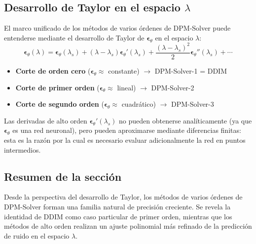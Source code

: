 \subsection{Desarrollo de Taylor en el espacio $\lambda$}

El marco unificado de los métodos de varios órdenes de DPM-Solver puede entenderse mediante el desarrollo de Taylor de $\boldsymbol{\epsilon}_\theta$ en el espacio $\lambda$:
$$\boldsymbol{\epsilon}_\theta(\lambda) = \boldsymbol{\epsilon}_\theta(\lambda_s) + (\lambda - \lambda_s) \boldsymbol{\epsilon}_\theta'(\lambda_s) + \frac{(\lambda - \lambda_s)^2}{2} \boldsymbol{\epsilon}_\theta''(\lambda_s) + \cdots$$

\begin{itemize}
    \item \textbf{Corte de orden cero} ($\boldsymbol{\epsilon}_\theta \approx$ constante) $\to$ DPM-Solver-1 = DDIM
    \item \textbf{Corte de primer orden} ($\boldsymbol{\epsilon}_\theta \approx$ lineal) $\to$ DPM-Solver-2
    \item \textbf{Corte de segundo orden} ($\boldsymbol{\epsilon}_\theta \approx$ cuadrático) $\to$ DPM-Solver-3
\end{itemize}

Las derivadas de alto orden $\boldsymbol{\epsilon}_\theta'(\lambda_s)$ no pueden obtenerse analíticamente (ya que $\boldsymbol{\epsilon}_\theta$ es una red neuronal), pero pueden aproximarse mediante diferencias finitas: esta es la razón por la cual es necesario evaluar adicionalmente la red en puntos intermedios.

\subsection{Resumen de la sección}

Desde la perspectiva del desarrollo de Taylor, los métodos de varios órdenes de DPM-Solver forman una familia natural de precisión creciente. Se revela la identidad de DDIM como caso particular de primer orden, mientras que los métodos de alto orden realizan un ajuste polinomial más refinado de la predicción de ruido en el espacio $\lambda$.

